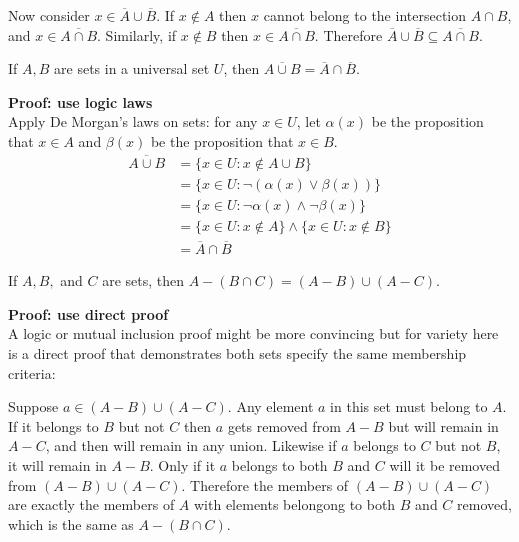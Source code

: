 \documentclass{article}
\begin{document}
Now consider $x \in \overline{A} \cup \overline{B}$. If $x \not\in A$ then $x$ cannot belong to the intersection $A \cap B$, and $x \in \overline{A \cap B}$. Similarly, if $x \not\in B$ then $x \in \overline{A \cap B}$. Therefore $\overline{A} \cup \overline{B} \subseteq \overline{A \cap B}$.


\begin{problem}
If $A, B$ are sets in a universal set $U$, then $\overline{A \cup B} = \overline{A} \cap \overline{B}$.
\end{problem}
\textbf{Proof: use logic laws}
\\
Apply De Morgan's laws on sets: for any $x \in U$, let $\alpha(x)$ be the proposition that $x \in A$ and $\beta(x)$ be the proposition that $x \in B$.
\begin{align*}
    \overline{A \cup B} & = \{x \in U: x \not\in A \cup B\}                         \\
                        & = \{x \in U: \neg(\alpha(x) \lor \beta(x))\}              \\
                        & = \{x \in U: \neg\alpha(x) \land \neg\beta(x)\}           \\
                        & = \{x \in U: x \not\in A\} \land \{x \in U: x \not\in B\} \\
                        & = \overline{A} \cap \overline{B}
\end{align*}

\begin{problem}
If $A, B,$ and $C$ are sets, then $A - (B \cap C) = (A - B) \cup (A - C)$.
\end{problem}
\textbf{Proof: use direct proof}
\\

A logic or mutual inclusion proof might be more convincing but for variety here is a direct proof that demonstrates both sets specify the same membership criteria:

Suppose $a \in (A - B) \cup (A - C)$. Any element $a$ in this set must belong to $A$. If it belongs to $B$ but not $C$ then $a$ gets removed from $A - B$ but will remain in $A - C$, and then will remain in any union. Likewise if $a$ belongs to $C$ but not $B$, it will remain in $A - B$. Only if it $a$ belongs to both $B$ and $C$ will it be removed from $(A - B) \cup (A - C)$. Therefore the members of $(A - B) \cup (A - C)$ are exactly the members of $A$ with elements belongong to both $B$ and $C$ removed, which is the same as $A - (B \cap C)$.
\end{document}
